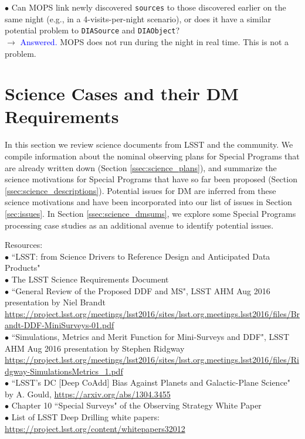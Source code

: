 \documentclass[DM,lsstdraft,toc]{lsstdoc}
\begin{document}
$\bullet$ Can MOPS link newly discovered {\tt sources} to those discovered earlier on the same night (e.g., in a 4-visits-per-night scenario), or does it have a similar potential problem to {\tt DIASource} and {\tt DIAObject}? \\
$\rightarrow$  \textcolor{blue}{Answered.} MOPS does not run during the night in real time. This is not a problem.




\clearpage
\section{Science Cases and their DM Requirements} \label{sec:science}

In this section we review science documents from LSST and the community. We compile information about the nominal observing plans for Special Programs that are already written down (Section \ref{ssec:science_plans}), and summarize the science motivations for Special Programs that have so far been proposed (Section \ref{ssec:science_descriptions}). Potential issues for DM are inferred from these science motivations and have been incorporated into our list of issues in Section \ref{sec:issues}. In Section \ref{ssec:science_dmsums}, we explore some Special Programs processing case studies as an additional avenue to identify potential issues.

\noindent Resources: \\
$\bullet$ ``LSST: from Science Drivers to Reference Design and Anticipated Data Products" \cite{2008arXiv0805.2366I} \\
$\bullet$ The LSST Science Requirements Document \cite{LPM-17} \\
$\bullet$ ``General Review of the Proposed DDF and MS", LSST AHM Aug 2016 presentation by Niel Brandt \url{https://project.lsst.org/meetings/lsst2016/sites/lsst.org.meetings.lsst2016/files/Brandt-DDF-MiniSurveys-01.pdf} \\
$\bullet$ ``Simulations, Metrics and Merit Function for Mini-Surveys and DDF", LSST AHM Aug 2016 presentation by Stephen Ridgway \url{https://project.lsst.org/meetings/lsst2016/sites/lsst.org.meetings.lsst2016/files/Ridgway-SimulationsMetrics_1.pdf}\\
$\bullet$ ``LSST's DC [Deep CoAdd] Bias Against Planets and Galactic-Plane Science" by A. Gould, \cite{2013arXiv1304.3455G} \url{https://arxiv.org/abs/1304.3455} \\
$\bullet$ Chapter 10 ``Special Surveys" of the Observing Strategy White Paper \cite{OSWP} \\
$\bullet$ List of LSST Deep Drilling white papers: \url{https://project.lsst.org/content/whitepapers32012} \\
\end{document}
